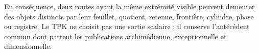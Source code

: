 En conséquence, deux routes ayant la même extrémité visible peuvent demeurer
des objets distincts par leur feuillet, quotient, retenue, frontière, cylindre, phase ou
registre. Le TPK ne choisit pas une sortie scalaire : il conserve l'antécédent commun
dont partent les publications archimédienne, exceptionnelle et dimensionnelle.

\long{}
